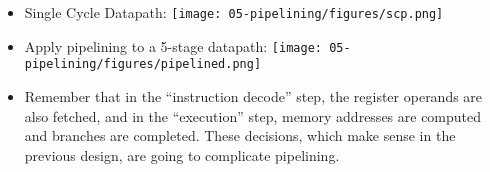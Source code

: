 




\begin{frame}[fragile]
\begin{itemize}
\item Single Cycle Datapath:
\texttt{[image: 05-pipelining/figures/scp.png]}
\item Apply pipelining to a 5-stage datapath:
\texttt{[image: 05-pipelining/figures/pipelined.png]}
\end{itemize}
\BNotes\ifnum{}
\begin{itemize}
\item
Remember that in the ``instruction decode'' step, the register
operands are also fetched, and in the ``execution'' step, memory
addresses are computed and branches are completed. These decisions,
which make sense in the previous design, are going to complicate 
pipelining.

\end{itemize}
\fi\ENotes
\end{frame}






